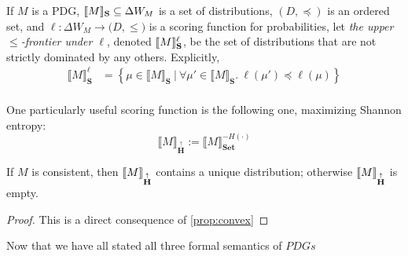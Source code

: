 \documentclass{article}
\newcommand\changeon{\color{note-fg} }
\newcommand\changeoff{\color{black} }
\newcommand\Set{\textbf{Set}}
\newcommand\MaxEnt{{\overset{\uparrow}{\mathbf H}}}
\newcommand{\MN}{PDG}
\newcommand{\MNs}{\MN s}
\begin{document}
	\begin{defn}
		If  $M$ is a \MN, $\llbracket M\rrbracket_{\mathbf S} \subseteq \Delta W_{M}$ is a set of distributions, $(D, \preceq)$ is an ordered set, and $\ell : \Delta W_{M} \to \mathbb (D, \leq)$ is a scoring function for probabilities, let \emph{the upper $\leq$-frontier under $\ell$}, denoted $\llbracket M\rrbracket_{\mathbf S}^\ell$, be the set of distributions that are not strictly dominated by any others. Explicitly,
		\begin{align*}
			\llbracket M \rrbracket_{\mathbf S}^\ell &=  \left\{\mu \in \llbracket M \rrbracket_{\mathbf S} ~\Big|~ \forall \mu' \in \llbracket M \rrbracket_{\mathbf S}.~ \ell(\mu') \preceq \ell(\mu)  \right\} \\
		\end{align*}
	\end{defn}
	One particularly useful scoring function is the following one, maximizing Shannon entropy:
	\[ \Big\llbracket M \Big\rrbracket_\MaxEnt := \Big\llbracket M \Big\rrbracket_\Set^{-H(\cdot)} \]

	\begin{theorem} 
		If $M$ is consistent, then $\bbr{M}_\MaxEnt$ contains a unique distribution; otherwise $\bbr{M}_\MaxEnt$ is empty.
	\end{theorem}
	\begin{proof}
		\vspace{-1em}
		This is a direct consequence of \cref{prop:convex}
	\end{proof}


	\changeon
	
	Now that we have all stated all three formal semantics of $\MNs$

	\changeoff
	
\end{document}
